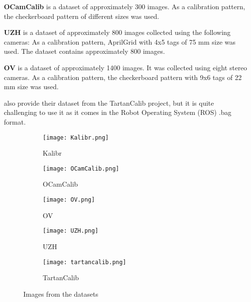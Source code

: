\textbf{OCamCalib} \cite{scaramuzzaFlexibleTechniqueAccurate2006} is a dataset
of approximately 300 images.
As a calibration pattern, the checkerboard pattern of different sizes was used.

\textbf{UZH} \cite{AreWeReady} is a dataset of approximately 800 images
collected using the following cameras:
As a calibration pattern, AprilGrid with 4x5 tags of 75 mm size was used.
The dataset contains approximately 800 images.

\textbf{OV} \cite{duisterhofTartanCalibIterativeWideAngle2022} is a dataset of
approximately 1400 images. It was collected using eight stereo cameras.
As a calibration pattern, the checkerboard pattern with 9x6 tags of 22 mm size
was used.

\textcite{duisterhofTartanCalibIterativeWideAngle2022} also provide their
dataset from the TartanCalib project, but it is quite challenging to use it as it
comes in the Robot Operating System (ROS) .bag format.

\begin{figure}[h!]
	\centering
	\begin{subfigure}[b]{0.3\linewidth}
		\texttt{[image: Kalibr.png]}
		\caption{Kalibr}
	\end{subfigure}
	\hfill
	\begin{subfigure}[b]{0.3\linewidth}
		\texttt{[image: OCamCalib.png]}
		\caption{OCamCalib}
	\end{subfigure}
	\hfill
	\begin{subfigure}[b]{0.3\linewidth}
		\texttt{[image: OV.png]}
		\caption{OV}
	\end{subfigure}
	\begin{subfigure}[b]{0.3\linewidth}
		\texttt{[image: UZH.png]}
		\caption{UZH}
	\end{subfigure}
	\begin{subfigure}[b]{0.3\linewidth}
		\texttt{[image: tartancalib.png]}
		\caption{TartanCalib}
	\end{subfigure}
	\caption{Images from the datasets}
\end{figure}




